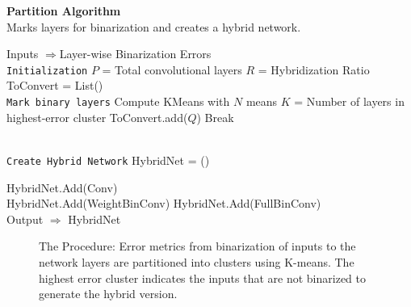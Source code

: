 \documentclass[10pt,twocolumn,letterpaper]{article}
\begin{document}
\begin{algorithm}[t]
\caption{{\bf Partition Algorithm} \\Marks layers for binarization and creates a hybrid network.}
\begin{algorithmic}[1]
\State Inputs $\Rightarrow$Layer-wise Binarization Errors
\\

\State \texttt{Initialization}
\State $P$ = Total convolutional layers
\State $R$ = Hybridization Ratio
\State ToConvert = List() \\
\State \texttt{Mark binary layers}
	\State Compute KMeans with $N$ means
	\State $K$ = Number of layers in highest-error cluster
        	\State ToConvert.add($Q$) 
    \EndFor
    \State Break
	\EndIf
\EndFor 

\\

\State \texttt{Create Hybrid Network}
\State HybridNet = ()

\State HybridNet.Add(Conv)
\\
            \State HybridNet.Add(WeightBinConv)
        \Else
        	\State HybridNet.Add(FullBinConv)
        \EndIf
\EndFor
\\
\State Output $\Rightarrow$ HybridNet

\end{algorithmic}
\label{alg:partitionalgo}
\end{algorithm}
\begin{figure*}[t]
\vspace*{-0.75cm}
\caption{The Procedure: Error metrics from binarization of inputs to the network layers are partitioned into clusters using K-means. The highest error cluster indicates the inputs that are not binarized to generate the hybrid version.}
\label{fig:pipeline}
\end{figure*}
\end{document}
